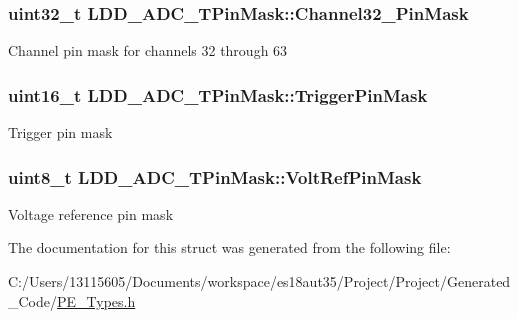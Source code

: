 \subsubsection[{Channel32\+\_\+63\+Pin\+Mask}]{\setlength{\rightskip}{0pt plus 5cm}uint32\+\_\+t L\+D\+D\+\_\+\+A\+D\+C\+\_\+\+T\+Pin\+Mask\+::\+Channel32\+\_\+Pin\+Mask}\label{struct_l_d_d___a_d_c___t_pin_mask_acd6bf6f512fb6e8cd170188dc663a4d8}
Channel pin mask for channels 32 through 63 \hypertarget{struct_l_d_d___a_d_c___t_pin_mask_a004a4d3a4f4071684e6676f64322215f}{}
\subsubsection[{Trigger\+Pin\+Mask}]{\setlength{\rightskip}{0pt plus 5cm}uint16\+\_\+t L\+D\+D\+\_\+\+A\+D\+C\+\_\+\+T\+Pin\+Mask\+::\+Trigger\+Pin\+Mask}\label{struct_l_d_d___a_d_c___t_pin_mask_a004a4d3a4f4071684e6676f64322215f}
Trigger pin mask \hypertarget{struct_l_d_d___a_d_c___t_pin_mask_a556430a91304e7db634bda25091b892c}{}
\subsubsection[{Volt\+Ref\+Pin\+Mask}]{\setlength{\rightskip}{0pt plus 5cm}uint8\+\_\+t L\+D\+D\+\_\+\+A\+D\+C\+\_\+\+T\+Pin\+Mask\+::\+Volt\+Ref\+Pin\+Mask}\label{struct_l_d_d___a_d_c___t_pin_mask_a556430a91304e7db634bda25091b892c}
Voltage reference pin mask 

The documentation for this struct was generated from the following file\+:\begin{DoxyCompactItemize}
\item 
C\+:/\+Users/13115605/\+Documents/workspace/es18aut35/\+Project/\+Project/\+Generated\+\_\+\+Code/\hyperlink{_p_e___types_8h}{P\+E\+\_\+\+Types.\+h}\end{DoxyCompactItemize}
